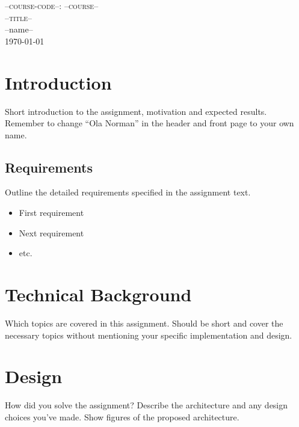 \documentclass{article}
\def\courseCode{--course-code--}
\def\course{--course--}
\def\thetitle{--title--}
\def\theauthor{--name--}
\begin{document}

\begin{center}
\textsc{\Large \courseCode: \course}\\[0.5cm]

\textsc{\LARGE \thetitle}\\[1.0cm]

\LARGE{\theauthor} \\[0.5cm]

{\large \today}

\end{center}



\setcounter{page}{1}

\section{Introduction}

Short introduction to the assignment, motivation and expected results. Remember to change ``Ola Norman'' in the header and front page to your own name.

\subsection{Requirements}

Outline the detailed requirements specified in the assignment text.

\begin{itemize}

\item First requirement
\item Next requirement
\item etc.

\end{itemize}


\section{Technical Background}

Which topics are covered in this assignment. Should be short and cover the necessary topics without mentioning your specific implementation and design.


\section{Design}

How did you solve the assignment? Describe the architecture and any design choices you've made. Show figures of the proposed architecture.
\end{document}
